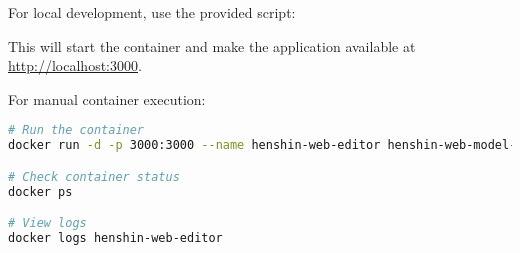 For local development, use the provided script:


This will start the container and make the application available at \url{http://localhost:3000}.

For manual container execution:

\begin{lstlisting}[language=bash]
# Run the container
docker run -d -p 3000:3000 --name henshin-web-editor henshin-web-model-transformation:latest

# Check container status
docker ps

# View logs
docker logs henshin-web-editor
\end{lstlisting}

